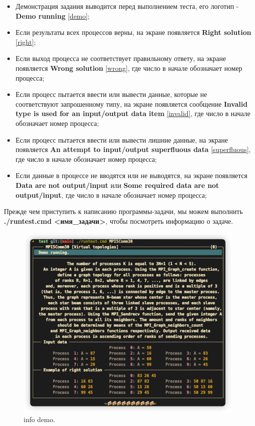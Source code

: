 \begin{itemize} 
    \item Демонстрация задания выводится перед выполнением теста, его логотип - \textbf{Demo running} \ref{demo};
    \item Если результаты всех процессов верны, на экране появляется \textbf{Right solution} \ref{right};
    \item Если выход процесса не соответствует правильному ответу, на экране появляется \textbf{Wrong solution} \ref{wrong}, где число в начале обозначает номер процесса;
    \item Если процесс пытается ввести или вывести данные, которые не соответствуют запрошенному типу, на экране появляется сообщение \textbf{Invalid type is used for an input/output data item} \ref{invalid}, где число в начале обозначает номер процесса;
    \item Если процесс пытается ввести или вывести лишние данные, на экране появляется \textbf{An attempt to input/output superfluous data} \ref{superfluous}, где число в начале обозначает номер процесса;
    \item Если данные в процессе не вводятся или не выводятся, на экране появляется \textbf{Data are not output/input} или \textbf{Some required data are not output/input}, где число в начале обозначает номер процесса;
\end{itemize}

Прежде чем приступить к написанию программы-задачи, мы можем выполнить \textbf{./runtest.cmd <имя\_задачи>}, чтобы посмотреть информацию о задаче.
\begin{figure}[htbp]%
    \centering
    \includegraphics[width=0.8\linewidth]{images/example.jpg}%
    \caption{info demo.}%
    \label{example}%
\end{figure}


